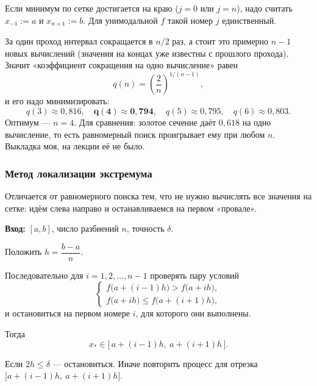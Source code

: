 
\begin{remark}
Если минимум по сетке достигается на краю ($j = 0$ или $j = n$), надо считать
$x_{-1} := a$ и $x_{n+1} := b$. Для унимодальной $f$ такой номер $j$
единственный.
\end{remark}

\begin{idea}[title={Какое $n$ брать — оценка (на лекции осталось вопросом)}]
За один проход интервал сокращается в $n/2$ раз, а стоит это примерно $n-1$
новых вычислений (значения на концах уже известны с прошлого прохода). Значит
«коэффициент сокращения на одно вычисление» равен
\[
  q(n) = \left(\frac{2}{n}\right)^{1/(n-1)} ,
\]
и его надо минимизировать:
\[
  q(3) \approx 0{,}816, \quad
  \mathbf{q(4) \approx 0{,}794}, \quad
  q(5) \approx 0{,}795, \quad
  q(6) \approx 0{,}803 .
\]
Оптимум — $n = 4$. Для сравнения: золотое сечение даёт $0{,}618$ на одно
вычисление, то есть равномерный поиск проигрывает ему при любом $n$. Выкладка
моя, на лекции её не было.
\end{idea}

\subsubsection*{Метод локализации экстремума}

Отличается от равномерного поиска тем, что не нужно вычислять все значения на
сетке: идём слева направо и останавливаемся на первом «провале».

\begin{algo}[title={Метод локализации экстремума}]
\textbf{Вход:} $[a,b]$, число разбиений $n$, точность $\delta$.

\begin{steps}
  \item Положить $h = \dfrac{b-a}{n}$.
  \item Последовательно для $i = 1, 2, \dots, n-1$ проверять пару условий
        \[
          \begin{cases}
            f\big(a + (i-1)h\big) > f\big(a + ih\big), \\[2pt]
            f\big(a + ih\big) \le f\big(a + (i+1)h\big),
          \end{cases}
        \]
        и остановиться на первом номере $i$, для которого они выполнены.
  \item Тогда
        \[
          x_* \in \big[\, a + (i-1)h, \ a + (i+1)h \,\big] .
        \]
  \item Если $2h \le \delta$ — остановиться. Иначе повторить процесс для
        отрезка $\big[a + (i-1)h,\ a + (i+1)h\big]$.
\end{steps}
\end{algo}

